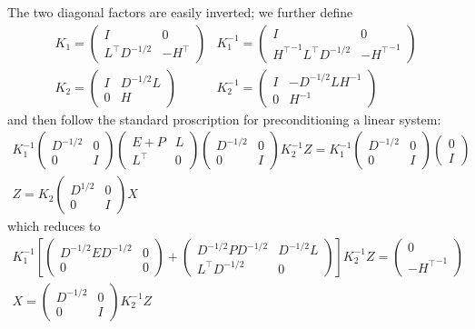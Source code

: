 The two diagonal factors are easily inverted; we further define
\[
\begin{array}{cc}
K_1 =
\begin{pmatrix}
I & 0\\
L^\top D^{-1/2} & -H^\top
\end{pmatrix}
&
K_1^{-1} =
\begin{pmatrix}
I & 0\\
{H^\top}^{-1}L^\top D^{-1/2} & -{H^\top}^{-1}
\end{pmatrix}\\
K_2 =
\begin{pmatrix}
I & D^{-1/2}L\\
0 & H
\end{pmatrix}
&
K_2^{-1} =
\begin{pmatrix}
I & -D^{-1/2}LH^{-1}\\
0 & H^{-1}
\end{pmatrix}
\end{array}
\]
and then follow the standard proscription for preconditioning a linear system:
\begin{gather*}
K_1^{-1} \begin{pmatrix}D^{-1/2}&0\\0&I\end{pmatrix}
\begin{pmatrix}
E+P & L\\
L^\top & 0
\end{pmatrix}
\begin{pmatrix}D^{-1/2}&0\\0&I\end{pmatrix} K_2^{-1} Z = 
K_1^{-1} \begin{pmatrix}D^{-1/2}&0\\0&I\end{pmatrix} \begin{pmatrix}0\\I\end{pmatrix}\\
Z = K_2 \begin{pmatrix}D^{1/2} & 0\\0 & I\end{pmatrix}X
\end{gather*}
which reduces to
\begin{gather*}
K_1^{-1} 
\left[
\begin{pmatrix}D^{-1/2}ED^{-1/2}&0\\0&0\end{pmatrix}
+
\begin{pmatrix}D^{-1/2}PD^{-1/2}&D^{-1/2}L\\L^\top D^{-1/2}&0\end{pmatrix}
\right]
K_2^{-1} Z = 
\begin{pmatrix}0\\-{H^\top}^{-1}\end{pmatrix}\\
X = \begin{pmatrix}D^{-1/2}&0\\0&I\end{pmatrix}K_2^{-1}Z
\end{gather*}

